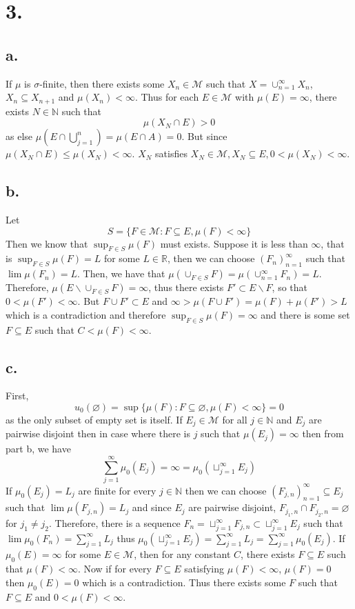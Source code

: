 \documentclass[11pt]{article}
\theoremstyle{mystyle}
\theoremstyle{definition}
\begin{document}
\section*{3.}
\subsection*{a.}
If $\mu$ is $\sigma$-finite, then there exists some $X_n \in \mathcal{M}$ such that $X = \cup_{n=1}^\infty X_n$, $X_n \subseteq X_{n+1}$ and $\mu(X_n) < \infty$. Thus for each $E \in \mathcal{M}$ with $\mu(E) = \infty$, there exists $N \in \mathbb{N}$ such that 
\[
  \mu(X_N \cap E)  > 0 
\]
as else 
$\mu(E \cap \bigcup_{j=1}^n) = \mu(E \cap A) = 0$. But since $\mu(X_N \cap E) \le \mu(X_N) < \infty$. $X_N$ satisfies $X_N \in \mathcal{M}, X_N \subseteq E, 0< \mu(X_N)< \infty $. 
\subsection*{b.}
Let 
\[
  S = \{ F \in \mathcal{M}: F \subseteq E, \mu(F) < \infty \}
\]
Then we know that $\sup_{F \in S} \mu(F)$ must exists.  Suppose it is less than $\infty$, that is $\sup_{F \in S} \mu(F) = L$ for some $L \in \mathbb{R}$, then we can choose $(F_n)_{n=1}^\infty$ such that $\lim \mu(F_n) = L$. Then, we have that $\mu(\cup_{F \in S} F) = \mu(\cup_{n =1}^\infty F_n) = L$. Therefore, $\mu(E \backslash \cup_{F \in S}F) = \infty$, thus there exists $F' \subset E \backslash F$, so that $0<\mu(F')<\infty$. But $F \cup F' \subset E$ and $\infty > \mu(F \cup F') = \mu(F) + \mu(F') > L$ which is a contradiction and therefore $\sup_{F \in S}\mu(F)= \infty$ and there is some set $F \subseteq E$ such that $C<\mu(F)< \infty$.  
\subsection*{c.}
First, 
\[
  u_0(\varnothing) = \sup \{\mu(F): F \subseteq \varnothing, \mu(F) < \infty \} = 0 
\]
as the only subset of empty set is itself. If $E_j \in \mathcal{M}$ for all $j \in \mathbb{N}$ and $E_j$ are pairwise disjoint then in case where there is $j$ such that $\mu(E_j) = \infty$ then from part b, we have  
\[
  \sum_{j=1}^\infty \mu_0(E_j) = \infty = \mu_0(\sqcup_{j=1}^\infty E_j)
\]
If $\mu_0(E_j) = L_j$ are finite for every $j \in \mathbb{N}$ then we can choose $(F_{j,n})_{n=1}^\infty \subseteq E_j$ such that $\lim \mu(F_{j,n}) = L_j$ and since $E_j$ are pairwise disjoint, $F_{j_1, n} \cap F_{j_2, n} = \varnothing$ for $j_1 \ne j_2$. Therefore, there is a sequence $F_n = \sqcup_{j=1}^\infty F_{j,n} \subset \sqcup_{j=1}^\infty E_j$ such that $\lim \mu_0(F_n) = \sum_{j=1}^\infty L_j$ thus $\mu_0(\sqcup_{j=1}^\infty E_j) = \sum_{j=1}^\infty L_j = \sum_{j=1}^\infty \mu_0(E_j)$. 
If $\mu_0(E) = \infty$ for some $E \in \mathcal{M}$, then for any constant $C$, there exists $F \subseteq E$ such that $\mu(F)<\infty$. Now if for every $F \subseteq E$ satisfying $\mu(F) < \infty$, $\mu(F) = 0$ then $\mu_0(E) = 0$ which is a contradiction. Thus there exists some $F$ such that $F \subseteq E$ and $0<\mu(F)<\infty$.  
\newpage
\end{document}
